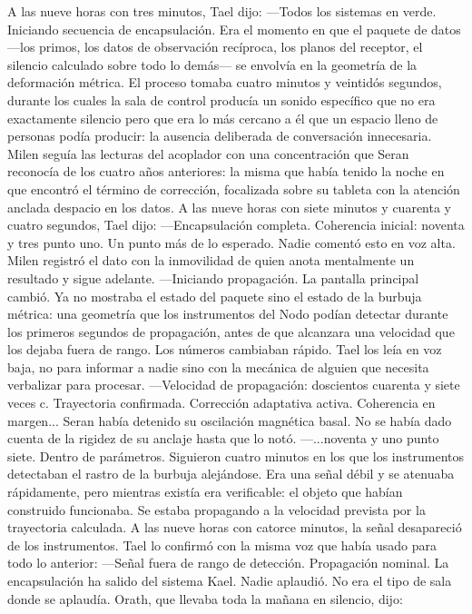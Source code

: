 \documentclass[11pt,a5paper,twoside]{book}
\begin{document}
A las nueve horas con tres minutos, Tael dijo:
—Todos los sistemas en verde. Iniciando secuencia de encapsulación.
Era el momento en que el paquete de datos —los primos, los datos de observación recíproca, los planos del receptor, el silencio calculado sobre todo lo demás— se envolvía en la geometría de la deformación métrica. El proceso tomaba cuatro minutos y veintidós segundos, durante los cuales la sala de control producía un sonido específico que no era exactamente silencio pero que era lo más cercano a él que un espacio lleno de personas podía producir: la ausencia deliberada de conversación innecesaria.
Milen seguía las lecturas del acoplador con una concentración que Seran reconocía de los cuatro años anteriores: la misma que había tenido la noche en que encontró el término de corrección, focalizada sobre su tableta con la atención anclada despacio en los datos.
A las nueve horas con siete minutos y cuarenta y cuatro segundos, Tael dijo:
—Encapsulación completa. Coherencia inicial: noventa y tres punto uno.
Un punto más de lo esperado. Nadie comentó esto en voz alta. Milen registró el dato con la inmovilidad de quien anota mentalmente un resultado y sigue adelante.
—Iniciando propagación.
La pantalla principal cambió. Ya no mostraba el estado del paquete sino el estado de la burbuja métrica: una geometría que los instrumentos del Nodo podían detectar durante los primeros segundos de propagación, antes de que alcanzara una velocidad que los dejaba fuera de rango. Los números cambiaban rápido. Tael los leía en voz baja, no para informar a nadie sino con la mecánica de alguien que necesita verbalizar para procesar.
—Velocidad de propagación: doscientos cuarenta y siete veces c. Trayectoria confirmada. Corrección adaptativa activa. Coherencia en margen...
Seran había detenido su oscilación magnética basal. No se había dado cuenta de la rigidez de su anclaje hasta que lo notó.
—...noventa y uno punto siete. Dentro de parámetros.
Siguieron cuatro minutos en los que los instrumentos detectaban el rastro de la burbuja alejándose. Era una señal débil y se atenuaba rápidamente, pero mientras existía era verificable: el objeto que habían construido funcionaba. Se estaba propagando a la velocidad prevista por la trayectoria calculada.
A las nueve horas con catorce minutos, la señal desapareció de los instrumentos.
Tael lo confirmó con la misma voz que había usado para todo lo anterior:
—Señal fuera de rango de detección. Propagación nominal. La encapsulación ha salido del sistema Kael.
Nadie aplaudió. No era el tipo de sala donde se aplaudía.
Orath, que llevaba toda la mañana en silencio, dijo:
\end{document}
